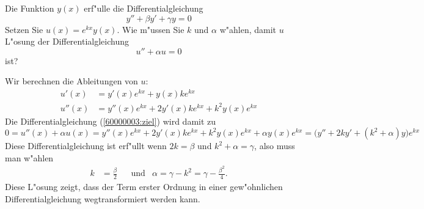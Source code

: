 Die Funktion $y(x)$ erf"ulle die Differentialgleichung
\begin{equation}
y''+\beta y' + \gamma y=0
\label{60000003:vorgabe}
\end{equation}
Setzen Sie $u(x)=e^{k x}y(x)$.
Wie m"ussen Sie $k$ und $\alpha$ w"ahlen, damit $u$ L"osung der
Differentialgleichung
\begin{equation}
u''+\alpha u=0
\label{60000003:ziel}
\end{equation}
ist?

\begin{loesung}
Wir berechnen die Ableitungen von $u$:
\begin{align*}
u'(x)&=y'(x)e^{kx}+y(x)ke^{kx}\\
u''(x)&=y''(x)e^{kx}+2y'(x)ke^{kx}+k^2y(x)e^{kx}
\end{align*}
Die Differentialgleichung  (\ref{60000003:ziel}) wird damit
zu
\[
0
=
u''(x)+\alpha u(x)
=
y''(x)e^{kx}+2y'(x)ke^{kx}+k^2y(x)e^{kx}
+ \alpha y(x)e^{kx}
=
\bigl(
y''+2k y' +(k^2+\alpha)y
\bigr)
e^{kx}
\]
Diese Differentialgleichung ist erf"ullt wenn $2k=\beta$ und
$k^2+\alpha=\gamma$, also muss man w"ahlen
\[
\begin{aligned}
k&=\frac{\beta}2
&
&\text{und}&
\alpha=\gamma-k^2=\gamma-\frac{\beta^2}4.
\end{aligned}
\]
Diese L"osung zeigt, dass der Term erster Ordnung in einer gew"ohnlichen
Differentialgleichung wegtransformiert werden kann.
\end{loesung}

